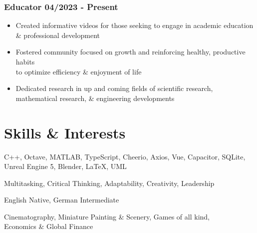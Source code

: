 \documentclass[10pt]{article} %
\begin{document}
\subsubsection{Educator \hfill 04/2023 - Present}
\begin{itemize}
    \item {Created informative videos for those seeking to engage in academic 
        education \\ \& professional development}
    \item {Fostered community focused on growth and reinforcing healthy, 
        productive habits \\ to optimize efficiency \& enjoyment of life}
    \item {Dedicated research in up and coming fields of scientific research, \\ 
        mathematical research, \& engineering developments}
\end{itemize}  

\section{Skills \& Interests}
\begin{description}[style=multiline, leftmargin=2.75cm]
    \item[Technical] {C++, Octave, MATLAB, TypeScript, Cheerio, Axios, Vue, Capacitor, SQLite, 
        Unreal Engine 5, Blender, LaTeX, UML}
    \item[Soft] Multitasking, Critical Thinking, Adaptability, Creativity, Leadership 
    \item[Languages] English Native, German Intermediate
    \item[Interests] {Cinematography, Miniature Painting \& Scenery, 
        Games of all kind, \\ Economics \& Global Finance}
\end{description}
\end{document}
